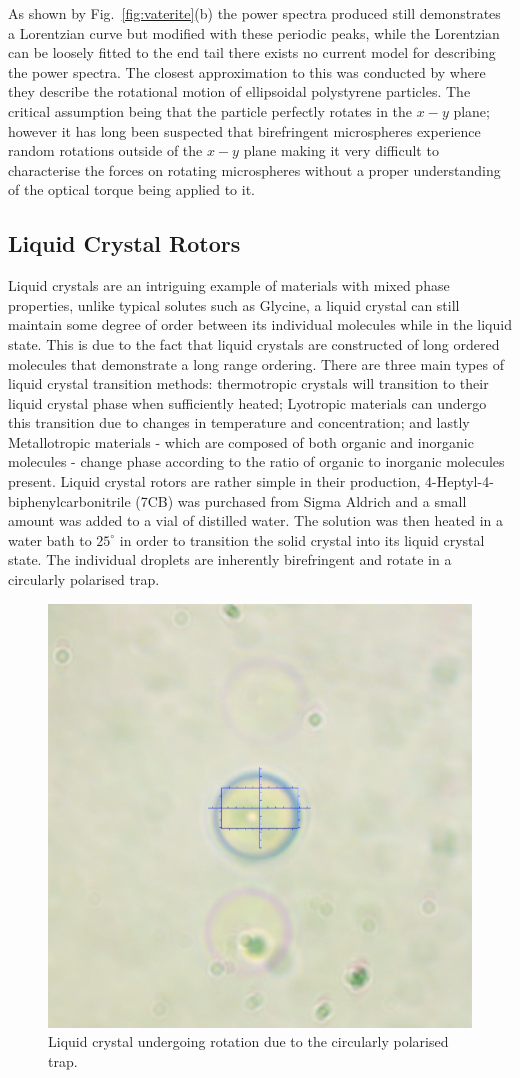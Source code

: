 As shown by Fig.~\ref{fig:vaterite}(b) the power spectra produced still 
demonstrates a Lorentzian curve but modified with these periodic peaks, 
while the Lorentzian can be loosely fitted to the end tail there exists 
no current model for describing the power spectra. The closest approximation
to this was conducted by \cite{Yogesha2012} where they describe the 
rotational motion of ellipsoidal polystyrene particles. The critical assumption
being that the particle perfectly rotates in the $x-y$ plane; however it
has long been suspected that birefringent microspheres experience random
rotations outside of the $x-y$ plane \cite{Bang2020} making it very difficult 
to characterise the forces on rotating microspheres without a proper understanding 
of the optical torque being applied to it.

\subsection{Liquid Crystal Rotors}
Liquid crystals are an intriguing example of materials with mixed phase
properties, unlike typical solutes such as Glycine, a liquid crystal
can still maintain some degree of order between its individual molecules
while in the liquid state. This is due to the fact that liquid crystals
are constructed of long ordered molecules that demonstrate a long range
ordering. There are three main types of liquid crystal transition methods:
thermotropic crystals will transition to their liquid crystal phase when 
sufficiently heated; Lyotropic materials can undergo this transition due 
to changes in temperature and concentration; and lastly Metallotropic 
materials - which are composed of both organic and inorganic molecules - 
change phase according to the ratio of organic to inorganic molecules present.
Liquid crystal rotors are rather simple in their production, 
4-Heptyl-4-biphenylcarbonitrile (7CB) was purchased from Sigma Aldrich
and a small amount was added to a vial of distilled water. The solution 
was then heated in a water bath to $25^\circ$ in order to transition the
solid crystal into its liquid crystal state. The individual droplets 
are inherently birefringent and rotate in a circularly polarised trap. 
\begin{figure}[h!]
	\centering
	\includegraphics[width=0.5\linewidth]{LC_sample.png}
	\caption{Liquid crystal undergoing rotation due to the circularly polarised trap.} 
\end{figure}


